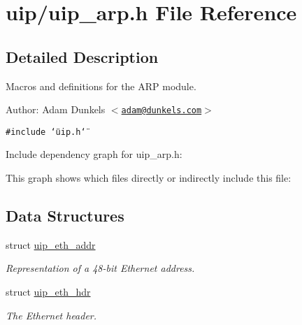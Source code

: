 \hypertarget{a00057}{
\section{uip/uip\_\-arp.h File Reference}
\label{a00057}
}


\subsection{Detailed Description}
Macros and definitions for the ARP module. 

\begin{Desc}
\item[Author:]Adam Dunkels $<$\href{mailto:adam@dunkels.com}{\tt adam@dunkels.com}$>$ \end{Desc}


{\tt \#include \char`\"{}uip.h\char`\"{}}\par


Include dependency graph for uip\_\-arp.h:

This graph shows which files directly or indirectly include this file:\subsection*{Data Structures}
\begin{CompactItemize}
\item 
struct \hyperlink{a00029}{uip\_\-eth\_\-addr}
\begin{CompactList}\small\item\em Representation of a 48-bit Ethernet address. \item\end{CompactList}\item 
struct \hyperlink{a00030}{uip\_\-eth\_\-hdr}
\begin{CompactList}\small\item\em The Ethernet header. \item\end{CompactList}\end{CompactItemize}
